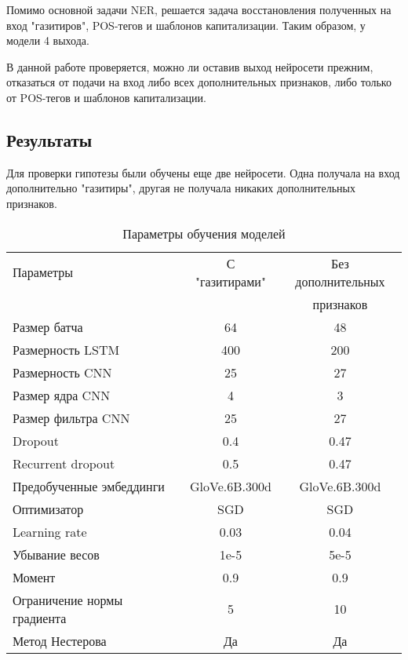 \documentclass[a4paper,14pt]{extarticle}
\begin{document}
Помимо основной задачи NER, решается задача восстановления полученных на вход "газитиров", POS-тегов и шаблонов капитализации. Таким образом, у модели 4 выхода.

В данной работе проверяется, можно ли оставив выход нейросети прежним, отказаться от подачи на вход либо всех дополнительных признаков, либо только от POS-тегов и шаблонов капитализации.

\subsection{Результаты}

Для проверки гипотезы были обучены еще две нейросети. Одна получала на вход дополнительно "газитиры", другая не получала никаких дополнительных признаков.

\begin{table}[H]
    \caption{Параметры обучения моделей}
    \label{progress}
    \begin{center}
    \begin{tabular}{l|c|c}
        Параметры                   & С "газитирами" & Без дополнительных \\
                                    &                & признаков          \\
        \hline
        Размер батча                & 64             & 48                 \\
        Размерность LSTM            & 400            & 200                \\
        Размерность CNN             & 25             & 27                 \\
        Размер ядра CNN             & 4              & 3                  \\
        Размер фильтра CNN          & 25             & 27                 \\
        Dropout                     & 0.4            & 0.47               \\
        Recurrent dropout           & 0.5            & 0.47               \\
        Предобученные эмбеддинги    & GloVe.6B.300d  & GloVe.6B.300d      \\
        Оптимизатор                 & SGD            & SGD                \\
        Learning rate               & 0.03           & 0.04               \\
        Убывание весов              & 1e-5           & 5e-5               \\
        Момент                      & 0.9            & 0.9                \\
        Ограничение нормы градиента & 5              & 10                 \\
        Метод Нестерова             & Да             & Да                 \\
    \end{tabular}
    \end{center}
\end{table}
\end{document}
